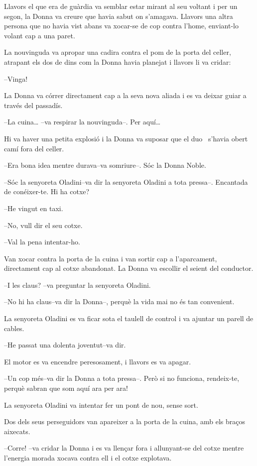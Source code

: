 Llavors el que era de guàrdia va semblar estar mirant al seu voltant i
per un segon, la Donna va creure que havia sabut on s'amagava. Llavors
una altra persona que no havia vist abans va xocar-se de cop contra
l'home, enviant-lo volant cap a una paret.

La nouvinguda va apropar una cadira contra el pom de la porta del
celler, atrapant els dos de dins com la Donna havia planejat i llavors
li va cridar:

--Vinga!

La Donna va córrer directament cap a la seva nova aliada i es va deixar
guiar a través del passadís.

--La cuina\ldots{} --va respirar la nouvinguda--. Per aquí\ldots{}

Hi va haver una petita explosió i la Donna va suposar que el duo
~s'havia obert camí fora del celler.

--Era bona idea mentre durava--va somriure--. Sóc la Donna Noble.

--Sóc la senyoreta Oladini--va dir la senyoreta Oladini a tota pressa--.
Encantada de conéixer-te. Hi ha cotxe?

--He vingut en taxi.

--No, vull dir el seu cotxe.

--Val la pena intentar-ho.

Van xocar contra la porta de la cuina i van sortir cap a l'aparcament,
directament cap al cotxe abandonat. La Donna va escollir el seient del
conductor.

--I les claus? --va preguntar la senyoreta Oladini.

--No hi ha claus--va dir la Donna--, perquè la vida mai no és tan
convenient.

La senyoreta Oladini es va ficar sota el taulell de control i va ajuntar
un parell de cables.

--He passat una dolenta joventut--va dir.

El motor es va encendre peresosament, i llavors es va apagar.

--Un cop més--va dir la Donna a tota pressa--. Però si no funciona,
rendeix-te, perquè sabran que som aquí ara per ara!

La senyoreta Oladini va intentar fer un pont de nou, sense sort.

Dos dels seus perseguidors van apareixer a la porta de la cuina, amb els
braços aixecats.

--Corre! --va cridar la Donna i es va llençar fora i allunyant-se del
cotxe mentre l'energia morada xocava contra ell i el cotxe explotava.

